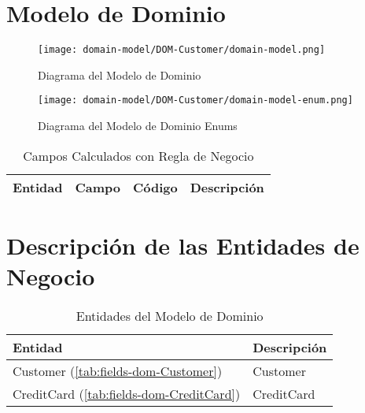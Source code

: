 \clearpage
\section{Modelo de Dominio} \label{sec:dom-customer}
\begin{figure}[H]
\begin{center}
	\label{tab:uml-domain-model}
	\texttt{[image: domain-model/DOM-Customer/domain-model.png]}
	\caption{Diagrama del Modelo de Dominio}
\end{center}
\end{figure}
\begin{figure}[H]
		\begin{center}
			\label{tab:uml-domain-model}
			\texttt{[image: domain-model/DOM-Customer/domain-model-enum.png]}
			\caption{Diagrama del Modelo de Dominio Enums}
		\end{center}
\end{figure}
\begin{table}[H]
			\caption{Campos Calculados con Regla de Negocio}
			\label{tab:entities}
			\begin{center}
			\begin{tabularx}{0.90\linewidth}{ X X X X}
				\hline
				\textbf{Entidad} & \textbf{Campo} & \textbf{C\'odigo} & \textbf{Descripci\'on} \\
				\hline
				\hline
			\end{tabularx}
			\end{center}
\end{table}

\clearpage
\section{Descripci\'on de las Entidades de Negocio} \label{sec:dom-entities-customer}

\begin{table}[H]
	\caption{Entidades del Modelo de Dominio}
	\label{tab:entities}
	\begin{center}
	\begin{tabularx}{0.90\linewidth}{ X X }
		\hline
		\textbf{Entidad} & \textbf{Descripci\'on} \\
		\hline
		Customer (\ref{tab:fields-dom-Customer}) & Customer \\
		CreditCard (\ref{tab:fields-dom-CreditCard}) & CreditCard \\
		\hline
	\end{tabularx}
	\end{center}
\end{table}
